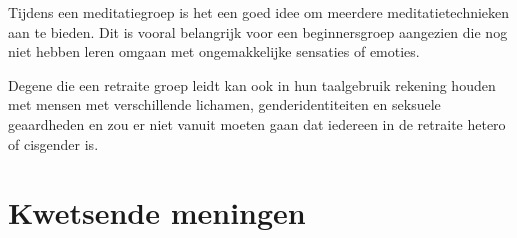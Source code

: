 \documentclass[12pt,openany]{book}
\begin{document}
Tijdens een meditatiegroep is het een goed idee om meerdere meditatietechnieken aan te bieden. Dit is vooral belangrijk voor een beginnersgroep aangezien die nog niet hebben leren omgaan met ongemakkelijke sensaties of emoties.

Degene die een retraite groep leidt kan ook in hun taalgebruik rekening houden met mensen met verschillende lichamen, genderidentiteiten en seksuele geaardheden en zou er niet vanuit moeten gaan dat iedereen in de retraite hetero of cisgender is.

\begin{figure}[h]
    \centering
\end{figure}

\chapter*{Kwetsende meningen}

\begin{figure}[h]
    \centering
\end{figure}
\end{document}
